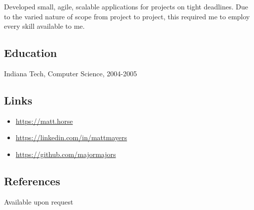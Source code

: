 \documentclass[]{article}
\providecommand{\tightlist}{%
  \setlength{\itemsep}{0pt}\setlength{\parskip}{0pt}}
\begin{document}
Developed small, agile, scalable applications for projects on tight
deadlines. Due to the varied nature of scope from project to project,
this required me to employ every skill available to me.

\subsection{Education}\label{education}

Indiana Tech, Computer Science, 2004-2005

\subsection{Links}\label{links}

\begin{itemize}
\tightlist
\item
  \url{https://matt.horse}
\item
  \url{https://linkedin.com/in/mattmayers}
\item
  \url{https://github.com/majormajors}
\end{itemize}

\subsection{References}\label{references}

Available upon request
\end{document}
